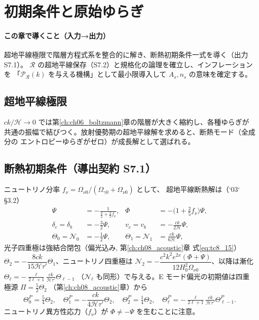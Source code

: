 \section{初期条件と原始ゆらぎ}
\label{ch:ch07_initial}

\paragraph{この章で導くこと（入力→出力）}
超地平線極限で階層方程式系を整合的に解き、断熱初期条件一式を導く（出力 S7.1）。
$\mathcal R$ の超地平線保存（S7.2）と規格化の論理を確立し、インフレーションを
「$\mathcal P_\mathcal R(k)$ を与える機構」として最小限導入して $A_s,n_s$ の意味を確定する。

\subsection{超地平線極限}
$ck/\mathcal H\to0$ では第\ref{ch:ch06_boltzmann}章の階層が大きく縮約し、各種ゆらぎが
共通の振幅で結びつく。放射優勢期の超地平線解を求めると、断熱モード（全成分の
エントロピーゆらぎがゼロ）が成長解として選ばれる。

\subsection{断熱初期条件（導出契約 S7.1）}
ニュートリノ分率 $f_\nu=\Omega_{\nu0}/(\Omega_{\gamma0}+\Omega_{\nu0})$ として、
超地平線断熱解は（`03` §3.2）
\begin{align}
  \Psi &= -\frac{1}{\tfrac32+\tfrac25 f_\nu}, &
  \Phi &= -\Big(1+\tfrac25 f_\nu\Big)\Psi, \\
  \delta_c=\delta_b &= -\tfrac32\Psi, &
  v_c=v_b &= -\frac{ck}{2\mathcal H}\Psi, \\
  \Theta_0=\mathcal N_0 &= -\tfrac12\Psi, &
  \Theta_1=\mathcal N_1 &= \frac{ck}{6\mathcal H}\Psi,
\end{align}
光子四重極は強結合閉包（偏光込み, 第\ref{ch:ch08_acoustic}章 式\eqref{eq:tc8_15}）
$\Theta_2=-\dfrac{8ck}{15\mathcal H\tau'}\Theta_1$、ニュートリノ四重極は
$\mathcal N_2=-\dfrac{c^2k^2e^{2x}(\Phi+\Psi)}{12H_0^2\Omega_{\nu0}}$、以降は漸化
$\Theta_\ell=-\tfrac{\ell}{2\ell+1}\tfrac{ck}{\mathcal H\tau'}\Theta_{\ell-1}$
（$\mathcal N_\ell$ も同形）で与える。E モード偏光の初期値は四重極源 $\Pi=\tfrac52\Theta_2$
（第\ref{ch:ch08_acoustic}章）から
\begin{equation}
  \Theta^P_0=\tfrac54\Theta_2,\quad
  \Theta^P_1=-\frac{ck}{4\mathcal H\tau'}\Theta_2,\quad
  \Theta^P_2=\tfrac14\Theta_2,\quad
  \Theta^P_\ell=-\tfrac{\ell}{2\ell+1}\tfrac{ck}{\mathcal H\tau'}\Theta^P_{\ell-1}.
  \label{eq:ic_pol}
\end{equation}
ニュートリノ異方性応力（$f_\nu$）が $\Phi\ne-\Psi$ を生むことに注意。

